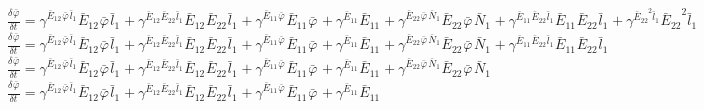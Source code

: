 $\frac{{\delta}^{} {\bar{\varphi}}_{}}{{\delta} {{{t}}_{}}^{}} = {\gamma}^{{{{\bar{E}}_{12}}^{}{{\bar{\varphi}}_{}}^{}{{\bar{l}}_{1}}^{}}}{{{\bar{E}}_{12}}^{}{{\bar{\varphi}}_{}}^{}{{\bar{l}}_{1}}^{}} + {\gamma}^{{{{\bar{E}}_{12}}^{}{{\bar{E}}_{22}}^{}{{\bar{l}}_{1}}^{}}}{{{\bar{E}}_{12}}^{}{{\bar{E}}_{22}}^{}{{\bar{l}}_{1}}^{}} + {\gamma}^{{{{\bar{E}}_{11}}^{}{{\bar{\varphi}}_{}}^{}}}{{{\bar{E}}_{11}}^{}{{\bar{\varphi}}_{}}^{}} + {\gamma}^{{{{\bar{E}}_{11}}^{}}}{{{\bar{E}}_{11}}^{}} + {\gamma}^{{{{\bar{E}}_{22}}^{}{{\bar{\varphi}}_{}}^{}{{\bar{N}}_{1}}^{}}}{{{\bar{E}}_{22}}^{}{{\bar{\varphi}}_{}}^{}{{\bar{N}}_{1}}^{}} + {\gamma}^{{{{\bar{E}}_{11}}^{}{{\bar{E}}_{22}}^{}{{\bar{l}}_{1}}^{}}}{{{\bar{E}}_{11}}^{}{{\bar{E}}_{22}}^{}{{\bar{l}}_{1}}^{}} + {\gamma}^{{{{\bar{E}}_{22}}^{2}{{\bar{l}}_{1}}^{}}}{{{\bar{E}}_{22}}^{2}{{\bar{l}}_{1}}^{}}$
$\frac{{\delta}^{} {\bar{\varphi}}_{}}{{\delta} {{{t}}_{}}^{}} = {\gamma}^{{{{\bar{E}}_{12}}^{}{{\bar{\varphi}}_{}}^{}{{\bar{l}}_{1}}^{}}}{{{\bar{E}}_{12}}^{}{{\bar{\varphi}}_{}}^{}{{\bar{l}}_{1}}^{}} + {\gamma}^{{{{\bar{E}}_{12}}^{}{{\bar{E}}_{22}}^{}{{\bar{l}}_{1}}^{}}}{{{\bar{E}}_{12}}^{}{{\bar{E}}_{22}}^{}{{\bar{l}}_{1}}^{}} + {\gamma}^{{{{\bar{E}}_{11}}^{}{{\bar{\varphi}}_{}}^{}}}{{{\bar{E}}_{11}}^{}{{\bar{\varphi}}_{}}^{}} + {\gamma}^{{{{\bar{E}}_{11}}^{}}}{{{\bar{E}}_{11}}^{}} + {\gamma}^{{{{\bar{E}}_{22}}^{}{{\bar{\varphi}}_{}}^{}{{\bar{N}}_{1}}^{}}}{{{\bar{E}}_{22}}^{}{{\bar{\varphi}}_{}}^{}{{\bar{N}}_{1}}^{}} + {\gamma}^{{{{\bar{E}}_{11}}^{}{{\bar{E}}_{22}}^{}{{\bar{l}}_{1}}^{}}}{{{\bar{E}}_{11}}^{}{{\bar{E}}_{22}}^{}{{\bar{l}}_{1}}^{}}$
$\frac{{\delta}^{} {\bar{\varphi}}_{}}{{\delta} {{{t}}_{}}^{}} = {\gamma}^{{{{\bar{E}}_{12}}^{}{{\bar{\varphi}}_{}}^{}{{\bar{l}}_{1}}^{}}}{{{\bar{E}}_{12}}^{}{{\bar{\varphi}}_{}}^{}{{\bar{l}}_{1}}^{}} + {\gamma}^{{{{\bar{E}}_{12}}^{}{{\bar{E}}_{22}}^{}{{\bar{l}}_{1}}^{}}}{{{\bar{E}}_{12}}^{}{{\bar{E}}_{22}}^{}{{\bar{l}}_{1}}^{}} + {\gamma}^{{{{\bar{E}}_{11}}^{}{{\bar{\varphi}}_{}}^{}}}{{{\bar{E}}_{11}}^{}{{\bar{\varphi}}_{}}^{}} + {\gamma}^{{{{\bar{E}}_{11}}^{}}}{{{\bar{E}}_{11}}^{}} + {\gamma}^{{{{\bar{E}}_{22}}^{}{{\bar{\varphi}}_{}}^{}{{\bar{N}}_{1}}^{}}}{{{\bar{E}}_{22}}^{}{{\bar{\varphi}}_{}}^{}{{\bar{N}}_{1}}^{}}$
$\frac{{\delta}^{} {\bar{\varphi}}_{}}{{\delta} {{{t}}_{}}^{}} = {\gamma}^{{{{\bar{E}}_{12}}^{}{{\bar{\varphi}}_{}}^{}{{\bar{l}}_{1}}^{}}}{{{\bar{E}}_{12}}^{}{{\bar{\varphi}}_{}}^{}{{\bar{l}}_{1}}^{}} + {\gamma}^{{{{\bar{E}}_{12}}^{}{{\bar{E}}_{22}}^{}{{\bar{l}}_{1}}^{}}}{{{\bar{E}}_{12}}^{}{{\bar{E}}_{22}}^{}{{\bar{l}}_{1}}^{}} + {\gamma}^{{{{\bar{E}}_{11}}^{}{{\bar{\varphi}}_{}}^{}}}{{{\bar{E}}_{11}}^{}{{\bar{\varphi}}_{}}^{}} + {\gamma}^{{{{\bar{E}}_{11}}^{}}}{{{\bar{E}}_{11}}^{}}$
